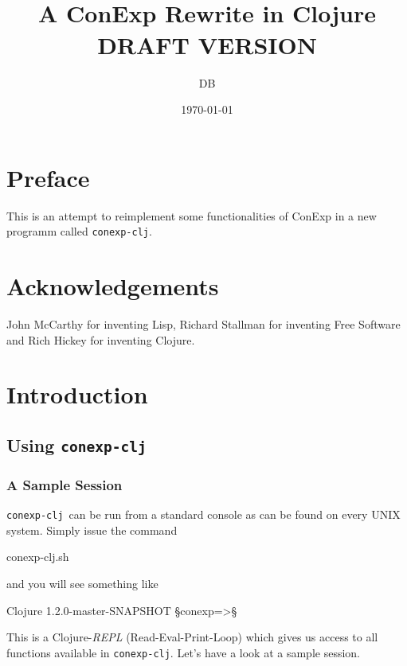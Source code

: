 \documentclass{scrbook}
\title{\conexpclj\\A ConExp Rewrite in Clojure\\[2cm]DRAFT VERSION}
\author{DB}
\date{\today}
\newcommand{\conexpclj}{\texttt{conexp-clj}}
\newcommand{\p}{\color{lightblue}}
\theoremstyle{plain}
\theoremstyle{plain}
\theoremstyle{plain}
\theoremstyle{nonumberplain}
\begin{document}
\maketitle


\chapter*{Preface}

This is an attempt to reimplement some functionalities of ConExp in a
new programm called \conexpclj.


\chapter*{Acknowledgements}

John McCarthy for inventing Lisp, Richard Stallman for inventing Free
Software and Rich Hickey for inventing Clojure.


\tableofcontents


\chapter{Introduction}

\section{Using \conexpclj}

\subsection{A Sample Session}

\conexpclj\ can be run from a standard console as can be found on
every UNIX system. Simply issue the command
\begin{conexp}
  conexp-clj.sh
\end{conexp}
and you will see something like
\begin{conexp}
  Clojure 1.2.0-master-SNAPSHOT
  §\p conexp=>§
\end{conexp}
This is a Clojure-\emph{REPL} (Read-Eval-Print-Loop) which gives us
access to all functions available in \conexpclj. Let's have a look at
a sample session.
\end{document}
